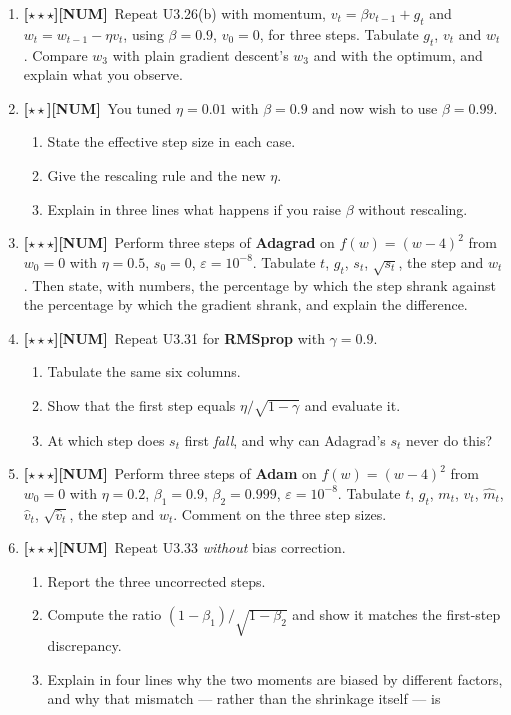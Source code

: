 \documentclass[11pt,a4paper]{article}
\newcommand{\LA}{{\footnotesize\textbf{[$\star\star\star$]}}}
\newcommand{\LB}{{\footnotesize\textbf{[$\star\star$]}}}
\newcommand{\NUM}{{\footnotesize\textbf{[NUM]}}}
\newcommand{\Q}[1]{\item[\textbf{#1}]}
\begin{document}
\begin{enumerate}[leftmargin=2.2cm]
\Q{U3.29}\LA\NUM\ Repeat U3.26(b) with momentum, $v_t = \beta v_{t-1} + g_t$
  and $w_t = w_{t-1} - \eta v_t$, using $\beta = 0.9$, $v_0 = 0$, for three
  steps. Tabulate $g_t$, $v_t$ and $w_t$. Compare $w_3$ with plain gradient
  descent's $w_3$ and with the optimum, and explain what you observe.
\Q{U3.30}\LB\NUM\ You tuned $\eta = 0.01$ with $\beta = 0.9$ and now wish to
  use $\beta = 0.99$.
  \begin{enumerate}[label=(\alph*)]
    \item State the effective step size in each case.
    \item Give the rescaling rule and the new $\eta$.
    \item Explain in three lines what happens if you raise $\beta$ without
      rescaling.
  \end{enumerate}
\Q{U3.31}\LA\NUM\ Perform three steps of \textbf{Adagrad} on $f(w) = (w-4)^2$
  from $w_0 = 0$ with $\eta = 0.5$, $s_0 = 0$, $\varepsilon = 10^{-8}$.
  Tabulate $t$, $g_t$, $s_t$, $\sqrt{s_t}$, the step and $w_t$. Then state, with
  numbers, the percentage by which the step shrank against the percentage by
  which the gradient shrank, and explain the difference.
\Q{U3.32}\LA\NUM\ Repeat U3.31 for \textbf{RMSprop} with $\gamma = 0.9$.
  \begin{enumerate}[label=(\alph*)]
    \item Tabulate the same six columns.
    \item Show that the first step equals $\eta/\sqrt{1-\gamma}$ and evaluate
      it.
    \item At which step does $s_t$ first \emph{fall}, and why can Adagrad's
      $s_t$ never do this?
  \end{enumerate}
\Q{U3.33}\LA\NUM\ Perform three steps of \textbf{Adam} on $f(w) = (w-4)^2$
  from $w_0 = 0$ with $\eta = 0.2$, $\beta_1 = 0.9$, $\beta_2 = 0.999$,
  $\varepsilon = 10^{-8}$. Tabulate $t$, $g_t$, $m_t$, $v_t$, $\hat m_t$,
  $\hat v_t$, $\sqrt{\hat v_t}$, the step and $w_t$. Comment on the three step
  sizes.
\Q{U3.34}\LA\NUM\ Repeat U3.33 \emph{without} bias correction.
  \begin{enumerate}[label=(\alph*)]
    \item Report the three uncorrected steps.
    \item Compute the ratio $(1-\beta_1)/\sqrt{1-\beta_2}$ and show it matches
      the first-step discrepancy.
    \item Explain in four lines why the two moments are biased by different
      factors, and why that mismatch — rather than the shrinkage itself — is

\end{enumerate}
\end{enumerate}
\end{document}
